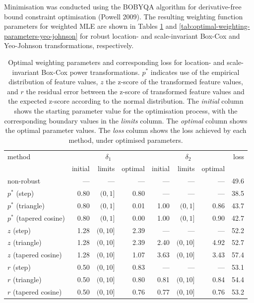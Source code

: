 \documentclass[
  a4paper,
]{article}
\begin{document}
Minimisation was conducted using the BOBYQA algorithm for
derivative-free bound constraint optimisation (Powell 2009). The
resulting weighting function parameters for weighted MLE are shown in
Tables \ref{tab:optimal-weighting-parameters-box-cox} and
\ref{tab:optimal-weighting-parameters-yeo-johnson} for robust location-
and scale-invariant Box-Cox and Yeo-Johnson transformations,
respectively.

\begin{table}
\begin{center}
\caption{Optimal weighting parameters and corresponding loss for location- and scale-invariant Box-Cox power transformations.
$p^{*}$ indicates use of the empirical distribution of feature values, $z$ the z-score of the transformed feature values,
and $r$ the residual error between the z-score of transformed feature values and the expected z-score according to the normal distribution. 
The \textit{initial} column shows the starting parameter value for the optimisation process, with the corresponding boundary values in the \textit{limits} column. 
The \textit{optimal} column shows the optimal parameter values.
The \textit{loss} column shows the loss achieved by each method, under optimised parameters.}
\label{tab:optimal-weighting-parameters-box-cox}
\begin{tabular}{l r r r r r r r}

\toprule
method & \multicolumn{3}{c}{$\delta_1$} & \multicolumn{3}{c}{$\delta_2$} & loss \\
& initial & limits & optimal & initial & limits & optimal & \\

\midrule
non-robust               & ---  & ---       & ---  & ---  & ---       & ---  & 49.6 \\
$p^{*}$ (step)           & 0.80 & $(0, 1]$  & 0.80 & ---  & ---       & ---  & 38.5 \\
$p^{*}$ (triangle)       & 0.80 & $(0, 1]$  & 0.01 & 1.00 & $(0, 1]$  & 0.86 & 43.7 \\
$p^{*}$ (tapered cosine) & 0.80 & $(0, 1]$  & 0.00 & 1.00 & $(0, 1]$  & 0.90 & 42.7 \\
$z$ (step)               & 1.28 & $(0, 10]$ & 2.39 & ---  & ---       & ---  & 52.2 \\
$z$ (triangle)           & 1.28 & $(0, 10]$ & 2.39 & 2.40 & $(0, 10]$ & 4.92 & 52.7 \\
$z$ (tapered cosine)     & 1.28 & $(0, 10]$ & 1.07 & 3.63 & $(0, 10]$ & 3.43 & 57.4 \\
$r$ (step)               & 0.50 & $(0, 10]$ & 0.83 & ---  & ---       & ---  & 53.1 \\
$r$ (triangle)           & 0.50 & $(0, 10]$ & 0.80 & 0.81 & $(0, 10]$ & 0.84 & 54.4 \\
$r$ (tapered cosine)     & 0.50 & $(0, 10]$ & 0.76 & 0.77 & $(0, 10]$ & 0.76 & 53.2 \\
\bottomrule
\end{tabular}
\end{center}
\end{table}
\end{document}
